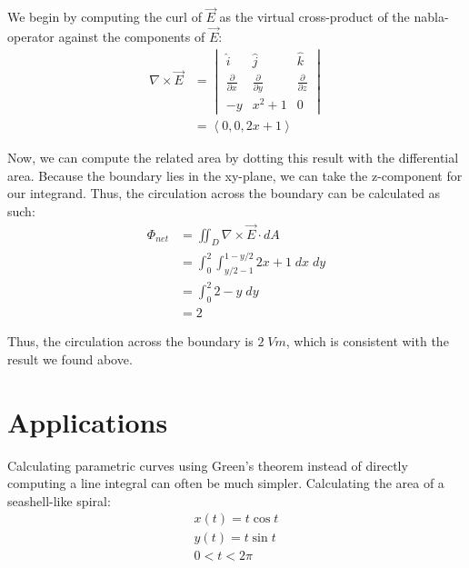 \documentclass[11pt,English]{article}
\begin{document}
We begin by computing the curl of $\vec{E}$ as the virtual cross-product of the nabla-operator against the components of $\vec{E}$:
\begin{align*}
    \nabla \times \vec{E} &=
    \begin{vmatrix}
        \hat{i} & \hat{j} & \hat{k} \\
        \frac{\partial}{\partial x} & \frac{\partial}{\partial y} & \frac{\partial}{\partial z} \\
        -y & x^2 + 1 & 0
    \end{vmatrix} \\
    &= \left<0,0,2x+1\right>
\end{align*}

Now, we can compute the related area by dotting this result with the differential area. Because the boundary lies in the xy-plane, we can take the z-component for our integrand. Thus, the circulation across the boundary can be calculated as such:
\begin{align*}
    \Phi_{net} &= \iint_D \nabla \times \vec{E} \cdot dA \\
    &= \int_0^2 \int_{y/2-1}^{1-y/2} 2x+1 \; dx \; dy \\
    &= \int_0^2 2-y \; dy \\
    &= 2
\end{align*}

Thus, the circulation across the boundary is $2 \; Vm$, which is consistent with the result we found above.

\section{Applications}
Calculating parametric curves using Green's theorem instead of directly computing a line integral can often be much simpler. Calculating the area of a seashell-like spiral:
\begin{align*}
    x(t) = t\cos{t} \\
    y(t) = t\sin{t}  \\
    0<t<2\pi \\
\end{align*}
\end{document}
